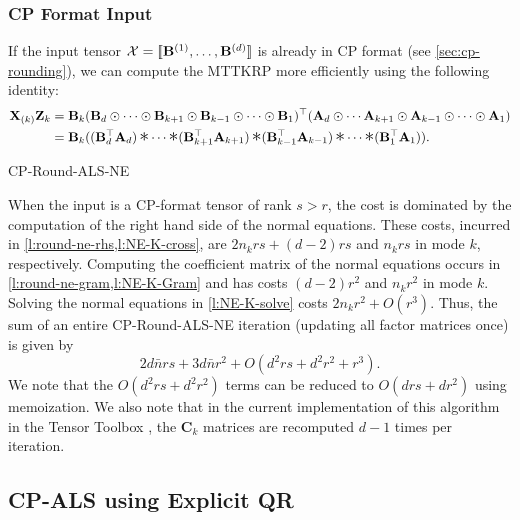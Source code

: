 \documentclass{article}
\newcommand{\mat}[1]{\mathbf{#1}}
\newcommand{\T}[2][]{#1{\mathbf{\cal{#2}}}} 						%
\DeclareMathOperator*{\hada}{\scalebox{1.5}{$\ast$}}
\begin{document}
\subsubsection{CP Format Input}

If the input tensor $\T{X}=[\![\mat{B}^{(1)}, \dots ,\mat{B}^{(d)}]\!]$ is already in CP format (see \cref{sec:cp-rounding}), we can compute the MTTKRP more efficiently using the following identity:
\begin{align*}
  \mat{X}_{(k)}\mat{Z}_k &= \mat{B}_k(\mat{B}_d \odot \dots \odot \mat{B}_{k+1} \odot \mat{B}_{k-1} \odot \dots \odot \mat{B}_1)^\top(\mat{A}_d \odot \cdots \mat{A}_{k+1} \odot \mat{A}_{k-1} \odot \cdots \odot \mat{A}_1) \\
 &= \mat{B}_k((\mat{B}_d^\top\mat{A}_d) \hada \cdots \hada (\mat{B}_{k+1}^\top\mat{A}_{k+1}) \hada (\mat{B}_{k-1}^\top\mat{A}_{k-1}) \hada \cdots \hada (\mat{B}_1^\top\mat{A}_1)).  
\end{align*}

\begin{algorithm}[!ht]
  \caption{CP-Round-ALS-NE}
  \label{alg:cp-als-ne-k}
   
\end{algorithm}


When the input is a CP-format tensor of rank $s>r$, the cost is dominated by the computation of the right hand side of the normal equations.
These costs, incurred in \cref{l:round-ne-rhs,l:NE-K-cross}, are $2n_krs+(d-2)rs$ and $n_krs$ in mode $k$, respectively.
Computing the coefficient matrix of the normal equations occurs in \cref{l:round-ne-gram,l:NE-K-Gram} and has costs $(d-2)r^2$ and $n_kr^2$ in mode $k$.
Solving the normal equations in \cref{l:NE-K-solve} costs $2n_kr^2 + O(r^3)$.
Thus, the sum of an entire CP-Round-ALS-NE iteration (updating all factor matrices once) is given by
\begin{equation*}
2d\bar{n}rs + 3d\bar{n}r^2 + O(d^2rs + d^2r^2 + r^3).
\end{equation*}
We note that the $O(d^2rs+d^2r^2)$ terms can be reduced to $O(drs+dr^2)$ using memoization.
We also note that in the current implementation of this algorithm in the Tensor Toolbox \cite{TensorToolbox}, the $\mat{C}_k$ matrices are recomputed $d-1$ times per iteration. 


\subsection{CP-ALS using Explicit QR}
\label{sec:alg:expqr}
\end{document}
